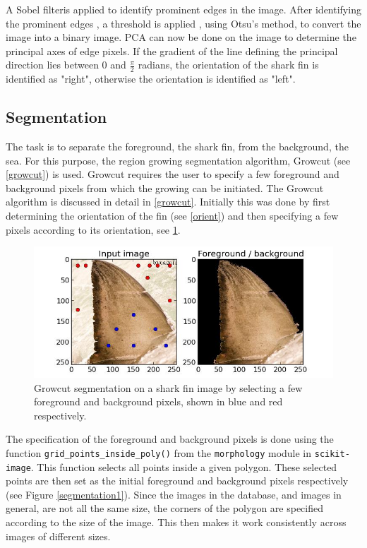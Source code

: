 \documentclass[a4paper,10pt]{article}
\begin{document}
A Sobel filteris applied 
to identify prominent edges in the image.  After identifying the prominent edges
, a threshold is applied , using Otsu's method, to convert the image into a binary image.
PCA can now be done on
the image to determine the principal axes of edge pixels.  If the gradient
of the line defining the principal direction lies between 0 and
$\frac{\pi}{2}$ radians, the orientation of the shark fin is
identified as
"right", otherwise the orientation is identified as "left". 

\subsection{Segmentation}
\label{segmentation}
The task is to separate the foreground, the shark fin, from the background,
the sea.  For this purpose, the region growing segmentation algorithm,
Growcut (see \ref{growcut}) is used.  Growcut requires the user to specify a few
foreground and background pixels from which the growing can be
initiated. The Growcut
  algorithm is discussed in detail in \ref{growcut}.
Initially this was done by first determining the orientation of the fin (see
\ref{orient}) and then specifying a few pixels according to its orientation, see 
\ref{segmentation}.  \\

\begin{figure}[H]
 \centering
 \includegraphics[width=5in]{segmentation.jpg}
 \caption{Growcut segmentation on a shark fin image by selecting a few
foreground and background pixels, shown in blue and red respectively.}
 \label{segmentation}
\end{figure}

The specification of
the foreground and background pixels is done using the function
\texttt{grid\_points\_inside\_poly()}\cite{scikit} from the \texttt{morphology} module in
\texttt{scikit-image}.  This function selects all points inside a given
polygon.  These selected  points are then set as the initial foreground and background pixels
respectively (see
Figure \ref{segmentation1}).
Since the images in the database, and images in general, are not
all the same size, the corners of the polygon are specified according to the size
of the image.  This then makes it work consistently across images of different sizes.  \\
\end{document}
